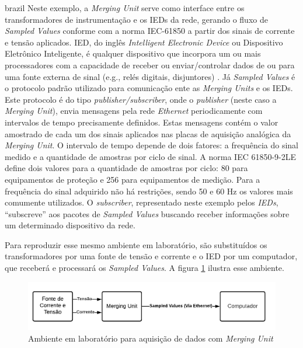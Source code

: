 \begin{otherlanguage*}{brazil}
Neste exemplo, a \textit{Merging Unit} serve como interface entre os transformadores de instrumentação e os IEDs da rede, gerando o fluxo de \textit{Sampled Values} conforme com a norma IEC-61850 \cite{IEC61850_7-2} a partir dos sinais de corrente e tensão aplicados. IED, do inglês \textit{Intelligent Electronic Device} ou Dispositivo Eletrônico Inteligente, é qualquer dispositivo que incorpora um ou mais processadores com a capacidade de receber ou enviar/controlar dados de ou para uma fonte externa de sinal (e.g., relés digitais, disjuntores) \cite{substation_basics}. Já \textit{Sampled Values} \cite{sv_typhoonhil} é o protocolo padrão utilizado para comunicação ente as \textit{Merging Units} e os IEDs. Este protocolo é do tipo \textit{publisher/subscriber}, onde o \textit{publisher} (neste caso a \textit{Merging Unit}), envia mensagens pela rede \textit{Ethernet} periodicamente com intervalos de tempo precisamente definidos. Estas mensagens contém o valor amostrado de cada um dos sinais aplicados nas placas de aquisição analógica da \textit{Merging Unit}. O intervalo de tempo depende de dois fatores: a frequência do sinal medido e a quantidade de amostras por ciclo de sinal. A norma IEC 61850-9-2LE \cite{IEC61850_7-2} define dois valores para a quantidade de amostras por ciclo: 80 para equipamentos de proteção e 256 para equipamentos de medição. Para a frequência do sinal adquirido não há restrições, sendo 50 e 60 Hz os valores mais comumente utilizados. O \textit{subscriber}, representado neste exemplo pelos \textit{IEDs}, ``subscreve'' aos pacotes de \textit{Sampled Values} buscando receber informações sobre um determinado dispositivo da rede.

Para reproduzir esse mesmo ambiente em laboratório, são substituídos os transformadores por uma fonte de tensão e corrente e o IED por um computador, que receberá e processará os \textit{Sampled Values}. A figura \ref{fig:met_acq} ilustra esse ambiente.

\begin{figure}
    \centering
    \includegraphics[width=12cm]{pictures/met_acq.png}
    \caption{Ambiente em laboratório para aquisição de dados com \textit{Merging Unit}}
    \label{fig:met_acq}
\end{figure}


\end{otherlanguage*}
